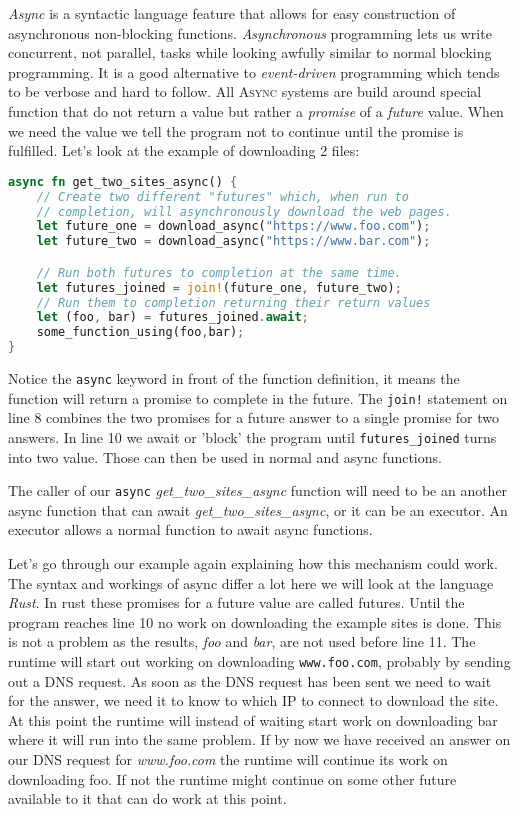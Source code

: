 \textit{Async} is a syntactic language feature that allows for easy construction of asynchronous non-blocking functions. \textit{Asynchronous} programming lets us write concurrent, not parallel, tasks while looking awfully similar to normal blocking programming. It is a good alternative to \textit{event-driven} programming which tends to be verbose and hard to follow. All \textsc{Async} systems are build around special function that do not return a value but rather a \textit{promise} of a \textit{future} value. When we need the value we tell the program not to continue until the promise is fulfilled. Let's look at the example of downloading 2 files:

\begin{lstlisting}[language=rust, style=boxed, tabsize=2]
async fn get_two_sites_async() {
	// Create two different "futures" which, when run to 
	// completion, will asynchronously download the web pages.
	let future_one = download_async("https://www.foo.com");
	let future_two = download_async("https://www.bar.com");

	// Run both futures to completion at the same time.
	let futures_joined = join!(future_one, future_two);
	// Run them to completion returning their return values
	let (foo, bar) = futures_joined.await;
	some_function_using(foo,bar);
}
\end{lstlisting}

Notice the \texttt{async} keyword in front of the function definition, it means the function will return a promise to complete in the future. The \texttt{join!} statement on line 8 combines the two promises for a future answer to a single promise for two answers. In line 10 we await or 'block' the program until \texttt{futures\_joined} turns into two value. Those can then be used in normal and async functions.

The caller of our \texttt{async} \textit{get\_two\_sites\_async} function will need to be an another async function that can await \textit{get\_two\_sites\_async}, or it can be an executor. An executor allows a normal function to await async functions.

Let's go through our example again explaining how this mechanism could work. The syntax and workings of async differ a lot here we will look at the language \textit{Rust}. In rust these promises for a future value are called futures. Until the program reaches line 10 no work on downloading the example sites is done. This is not a problem as the results, \textit{foo} and \textit{bar}, are not used before line 11. The runtime will start out working on downloading \texttt{www.foo.com}, probably by sending out a DNS request. As soon as the DNS request has been sent we need to wait for the answer, we need it to know to which IP to connect to download the site. At this point the runtime will instead of waiting start work on downloading bar where it will run into the same problem. If by now we have received an answer on our DNS request for \textit{www.foo.com} the runtime will continue its work on downloading foo. If not the runtime might continue on some other future available to it that can do work at this point.
